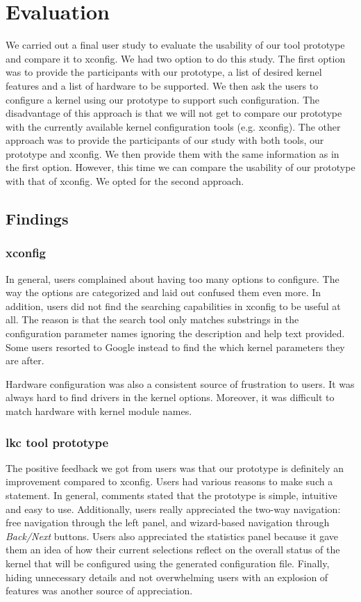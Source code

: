 \documentclass{chi2009}
\begin{document}
\section{Evaluation}\label{sec:evaluation}
We carried out a final user study to evaluate the usability of our tool prototype and compare it to \textsf{xconfig}. We had two option to do this study. The
first option was to provide the participants with our prototype, a list of desired kernel features and a list of hardware to be supported. We then ask the users
to configure a kernel using our prototype to support such configuration. The disadvantage of this approach is that we will not get to compare our prototype
with the currently available kernel configuration tools (e.g. \textsf{xconfig}). The other approach was to provide the participants of our study with both
tools, our prototype and \textsf{xconfig}. We then provide them with the same information as in the first option. However, this time we can compare the
usability of our prototype with that of \textsf{xconfig}. We opted for the second approach.

\subsection{Findings}
\subsubsection{\textsf{xconfig}}
In general, users complained about having too many options to configure. The way the options are categorized and laid out confused them even more. In addition,
users did not find the searching capabilities in \textsf{xconfig} to be useful at all. The reason is that the search tool only matches substrings in the
configuration parameter names ignoring the description and help text provided. Some users resorted to Google instead to find the which kernel parameters they
are after.

Hardware configuration was also a consistent source of frustration to users. It was always hard to find drivers in the kernel options. Moreover, it was
difficult to match hardware with kernel module names.

\subsubsection{\textsf{lkc tool prototype}}
The positive feedback we got from users was that our prototype is definitely an improvement compared to \textsf{xconfig}. Users had various reasons to make such
a statement. In general, comments stated that the prototype is simple, intuitive and easy to use. Additionally, users really appreciated the two-way navigation:
free navigation through the left panel, and wizard-based navigation through \textit{Back/Next} buttons. Users also appreciated the statistics panel because it
gave them an idea of how their current selections reflect on the overall status of the kernel that will be configured using the generated configuration file.
Finally, hiding unnecessary details and not overwhelming users with an explosion of features was another source of appreciation.
\end{document}
